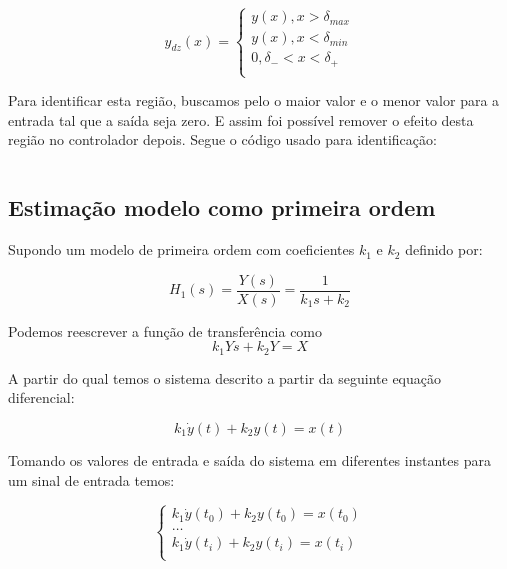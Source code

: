 \documentclass[a4paper,11pt]{article}
\begin{document}
\begin{equation}
    y_{dz}(x) = 
    \left\{\begin{array}{c}
    y(x), x > \delta_{max} \\
    y(x), x < \delta_{min} \\
    0, \delta_{-} < x < \delta_{+} \\
\end{array} \right.
\end{equation}

Para identificar esta região, buscamos pelo o maior valor e o menor valor para a entrada tal que a saída seja zero. E assim foi possível remover o efeito desta região no controlador depois. Segue o código usado para identificação:

\inputminted[frame=single,framesep=10pt]{matlab}{../src/matlab/deadzoneindetify.m}



\subsection{Estimação modelo como primeira ordem}

Supondo um modelo de primeira ordem com coeficientes $k_1$ e $k_2$ definido por:

\begin{equation}\label{eq:firstordertf}
    H_1(s) = \frac{Y(s)}{X(s)} = \frac{1}{k_1 s+ k_2}
\end{equation}


Podemos reescrever a função de transferência como
\begin{equation}
k_1 Ys + k_2 Y  = X
\end{equation}

A partir do qual temos o sistema descrito a partir da seguinte equação diferencial:

\begin{equation}
k_1 \dot{y}(t) + k_2 y(t) = x(t)
\end{equation}

Tomando os valores de entrada e saída do sistema em diferentes instantes para um sinal de entrada temos:

\begin{equation}
\left\{\begin{array}{c}
    k_1 \dot{y}(t_0) + k_2 y(t_0) = x(t_0)  \\
    \dots\\
    k_1 \dot{y}(t_i) + k_2 y(t_i) = x(t_i)  \\
\end{array} \right.
\end{equation}
\end{document}
